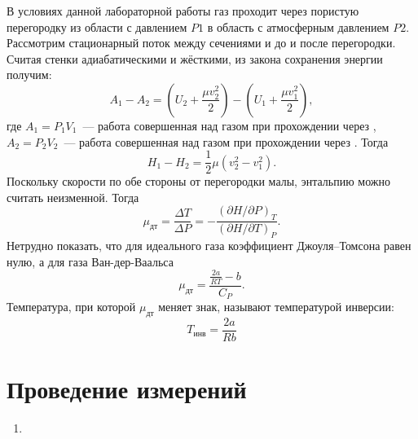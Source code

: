 \documentclass[a4paper,12pt]{article} %
\newcommand{\RomanNumeralCaps}[1]
{\MakeUppercase{\romannumeral #1}}
\begin{document}
\noindent В условиях данной лабораторной работы газ проходит через пористую
перегородку из области с давлением $ P1 $ в область с атмосферным давлением 
$ P2 $. Рассмотрим стационарный поток между сечениями \RomanNumeralCaps{1}
и \RomanNumeralCaps{2} до и после перегородки. Считая стенки
адиабатическими и жёсткими, из закона сохранения энергии получим: 
\begin{equation}\label{}
	A_1-A_2=
	\left(U_2+\dfrac{\mu v_2^2}{2}\right)-
	\left(U_1+\dfrac{\mu v_1^2}{2}\right),
\end{equation}
где $ A_1=P_1V_1 $~--- работа совершенная над газом при прохождении
через \RomanNumeralCaps{1}, $ A_2=P_2V_2 $~--- работа совершенная над
газом при прохождении через \RomanNumeralCaps{2}. Тогда
\begin{equation}\label{}
	H_1-H_2=\dfrac{1}{2}\mu(v_2^2-v_1^2).
\end{equation}
Поскольку скорости по обе стороны от перегородки малы, энтальпию можно
считать неизменной. Тогда 
\begin{equation}\label{}
	\mu_{дт}=\dfrac{\Delta T}{\Delta P}=
	-\dfrac{(\partial H/\partial P)_T}{(\partial H/\partial T)_P}.
\end{equation}
Нетрудно показать, что для идеального газа коэффициент Джоуля–Томсона равен
нулю, а для газа Ван-дер-Ваальса 
\begin{equation}\label{}
	\mu_{дт}=\dfrac{\frac{2a}{RT}-b}{C_P}.
\end{equation}
Температура, при которой $ \mu_{дт} $ меняет знак, называют температурой
инверсии: 
\begin{equation}\label{}
	T_{инв}=\dfrac{2a}{Rb}
\end{equation}


\section{Проведение измерений}
\begin{enumerate}
	\item 
\end{enumerate}
\end{document}
